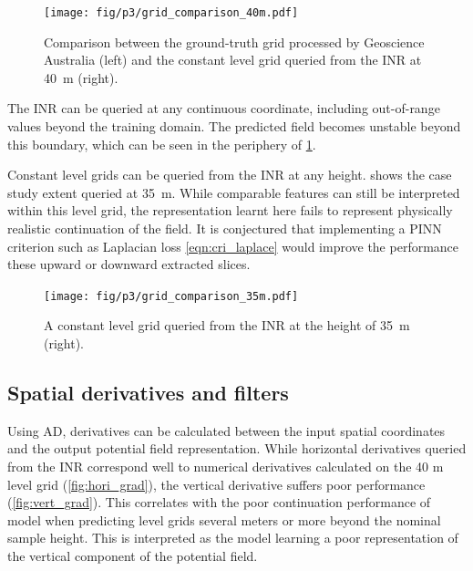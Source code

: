 \documentclass[manuscript.tex]{subfiles}
\begin{document}
\begin{figure}[hbt]
    \centering{}
    \texttt{[image: fig/p3/grid\_comparison\_40m.pdf]}
    \caption[Grid prediction]{Comparison between the ground-truth grid processed by Geoscience Australia (left) and the constant level grid queried from the INR at \SI{40}{\m} (right).}
    \label{fig:grid}
\end{figure}

The INR can be queried at any continuous coordinate, including out-of-range values beyond the training domain.
The predicted field becomes unstable beyond this boundary, which can be seen in the periphery of \cref{fig:grid}.

Constant level grids can be queried from the INR at any height.
 shows the case study extent queried at \SI{35}{\m}.
While comparable features can still be interpreted within this level grid, the representation learnt here fails to represent physically realistic continuation of the field.
It is conjectured that implementing a PINN criterion such as Laplacian loss \cref{eqn:cri_laplace} would improve the performance these upward or downward extracted slices.

\begin{figure}[hbt]
    \centering{}
    \texttt{[image: fig/p3/grid\_comparison\_35m.pdf]}
    \caption[Grid prediction]{A constant level grid queried from the INR at the height of \SI{35}{\m} (right).}
    \label{fig:grid35}
\end{figure}




\subsection{Spatial derivatives and filters}
Using AD, derivatives can be calculated between the input spatial coordinates and the output potential field representation.
While horizontal derivatives queried from the INR correspond well to numerical derivatives calculated on the 40 m level grid (\cref{fig:hori_grad}), the vertical derivative suffers poor performance (\cref{fig:vert_grad}).
This correlates with the poor continuation performance of model when predicting level grids several meters or more beyond the nominal sample height.
This is interpreted as the model learning a poor representation of the vertical component of the potential field.
\end{document}
